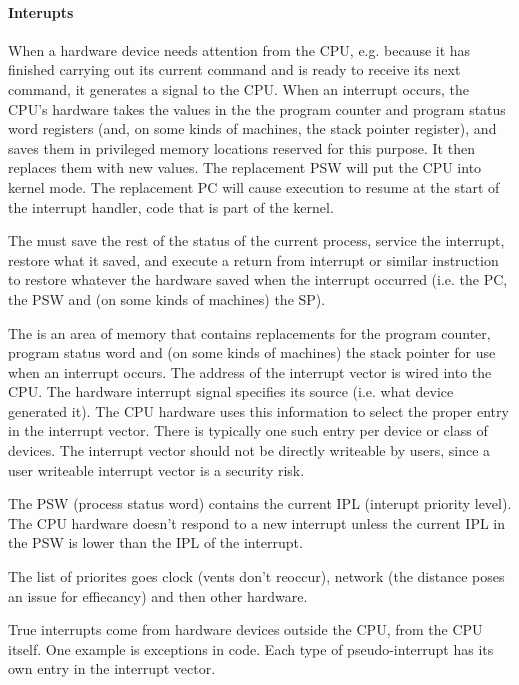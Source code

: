 \paragraph{Interupts}
When a hardware device needs attention from the CPU, e.g. because it
has finished carrying out its current command and is ready to receive its
next command, it generates a signal to  the CPU.
When an interrupt occurs, the CPU’s hardware takes the values in the the
program counter and program status word registers (and, on some kinds of
machines, the stack pointer register), and saves them in privileged memory
locations reserved for this purpose.
It then replaces them with new values.
The replacement PSW will put the CPU into kernel mode. The
replacement PC will cause execution to resume at the start of the
interrupt handler, code that is part of the kernel.

The  must
save the rest of the status of the current process,
service the interrupt,
restore what it saved, and
execute a return from interrupt or similar instruction to restore
whatever the hardware saved when the interrupt occurred (i.e. the
PC, the PSW and (on some kinds of machines) the SP).

The  is an area of memory that contains replacements for
the program counter, program status word and (on some kinds of
machines) the stack pointer for use when an interrupt occurs. The address
of the interrupt vector is wired into the CPU.
The hardware interrupt signal specifies its source (i.e. what device
generated it). The CPU hardware uses this information to select the
proper entry in the interrupt vector. There is typically one such entry per
device or class of devices.
The interrupt vector should not be directly writeable by users, since a user
writeable interrupt vector is a security risk.

The PSW (process status word) contains the current IPL (interupt priority level). The CPU hardware doesn’t respond to
a new interrupt unless the current IPL in the PSW is lower than the IPL of
the interrupt.

The list of priorites goes clock (vents don't reoccur), network (the distance poses an issue for effiecancy) and then other hardware.

True interrupts come from hardware devices outside the CPU,
 from the CPU itself. One example is exceptions in code. Each type of pseudo-interrupt has its own entry in the interrupt vector.

